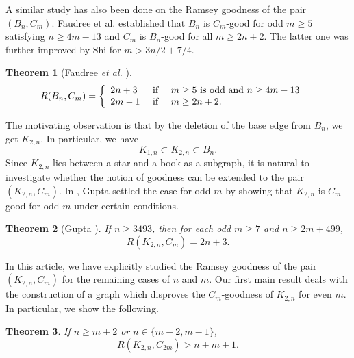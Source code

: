 \documentclass[12pt]{article}
\newtheorem{theorem}{Theorem}
\theoremstyle{definition}
\begin{document}
A similar study has also been done on the Ramsey goodness of the pair $(B_{n},C_{m})$. Faudree et al. \cite{faudree1991cycle} established that $B_{n}$ is $C_{m}$-good for odd $m\geq 5$ satisfying $n\geq4m-13$ and $C_{m}$ is $B_{n}$-good for all $m\geq 2n+2$. The latter one was further improved by Shi \cite{shi2010ramsey} for $m> 3n/2+7/4$.

\begin{theorem}[Faudree \emph{et al.} \cite{faudree1991cycle}] \label{thm: Faudree}
    \begin{align*}
R(B_{n},C_{m})&=\left\{\begin{array}{lll}
		2n+3& \textnormal{ if  }&  m\geq 5 \textnormal{ is odd and } n\geq 4m-13\\
        2m-1 &\textnormal{  if }& m\geq 2n+2.
    \end{array}\right.  
\end{align*}
\end{theorem}

The motivating observation is that by the deletion of the base edge from $B_n$, we get $K_{2,n}$. In particular,  we have
\begin{equation*}
    K_{1,n}\subset K_{2,n}\subset B_{n}.
\end{equation*}
 Since $K_{2,n}$ lies between a star and a book as a subgraph, it is natural to investigate whether the notion of goodness can be extended to the pair $(K_{2,n}, C_m)$. In \cite{gupta2025study}, Gupta settled the case for odd $m$ by showing that $K_{2,n}$ is $C_{m}$-good for odd $m$ under certain conditions.


\begin{theorem}[Gupta \cite{gupta2025study}]
If $n\geq 3493$, then for each odd $m\geq 7$ and $n\geq2m+499$,  
\begin{equation*}
 R(K_{2,n},C_{m})=2n+3.    
\end{equation*}
\end{theorem}

In this article, we have explicitly studied the Ramsey goodness of the pair $(K_{2,n},C_{m})$ for the remaining cases of $n$ and $m$. Our first main result deals with the construction of a graph which disproves the $C_{m}$-goodness of $K_{2,n}$ for even $m$. In particular, we show the following.

\begin{theorem}\label{thm:RamseyBadness in n>m+1}
If $n\geq m+2$ or $n\in \{m-2,m-1\}$,
$$R(K_{2,n},C_{2m})>n+m+1.$$
\end{theorem}
\end{document}

